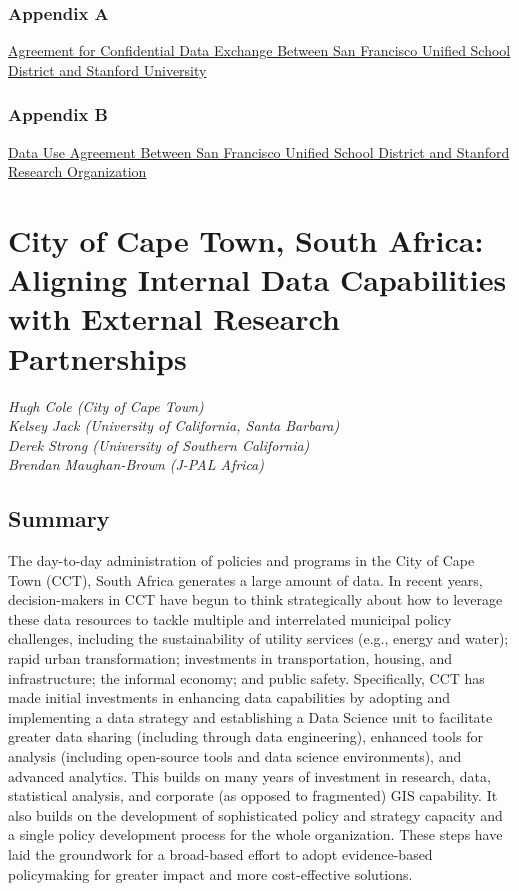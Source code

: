 \documentclass[
]{WileySix}
\begin{document}
\hypertarget{appendix-a-2}{%
\subsubsection*{Appendix A}\label{appendix-a-2}}

\href{./appendix/sfusd_appendix_a.pdf}{Agreement for Confidential Data Exchange Between San Francisco Unified School District and Stanford University}

\hypertarget{appendix-b-2}{%
\subsubsection*{Appendix B}\label{appendix-b-2}}

\href{./appendix/sfusd_appendix_b.pdf}{Data Use Agreement Between San Francisco Unified School District and Stanford Research Organization}

\hypertarget{cct}{%
\section{City of Cape Town, South Africa: Aligning Internal Data Capabilities with External Research Partnerships}\label{cct}}

\emph{Hugh Cole (City of Cape Town)}\\
\emph{Kelsey Jack (University of California, Santa Barbara)}\\
\emph{Derek Strong (University of Southern California)}\\
\emph{Brendan Maughan-Brown (J-PAL Africa)}

\hypertarget{summary-7}{%
\subsection{Summary}\label{summary-7}}

The day-to-day administration of policies and programs in the City of Cape Town (CCT), South Africa generates a large amount of data. In recent years, decision-makers in CCT have begun to think strategically about how to leverage these data resources to tackle multiple and interrelated municipal policy challenges, including the sustainability of utility services (e.g., energy and water); rapid urban transformation; investments in transportation, housing, and infrastructure; the informal economy; and public safety. Specifically, CCT has made initial investments in enhancing data capabilities by adopting and implementing a data strategy and establishing a Data Science unit to facilitate greater data sharing (including through data engineering), enhanced tools for analysis (including open-source tools and data science environments), and advanced analytics. This builds on many years of investment in research, data, statistical analysis, and corporate (as opposed to fragmented) GIS capability. It also builds on the development of sophisticated policy and strategy capacity and a single policy development process for the whole organization. These steps have laid the groundwork for a broad-based effort to adopt evidence-based policymaking for greater impact and more cost-effective solutions.
\end{document}
